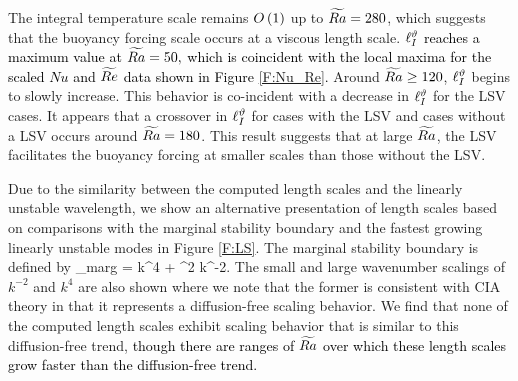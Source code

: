 The integral temperature scale remains $O\left ( 1 \right )$ up to $\widetilde{Ra} = 280$, which suggests that the buoyancy forcing scale occurs at a viscous length scale.
\textcolor{black}{$\ell_{I}^{\vartheta}$ reaches a maximum value at $\widetilde{Ra} = 50,$ which is coincident with the local maxima for the scaled $Nu$ and $\widetilde{Re}$ data shown in Figure \ref{F:Nu_Re}.}
Around $\widetilde{Ra} \geq 120$, $\ell_{I}^{\vartheta}$ begins to slowly increase. 
This behavior is co-incident with a decrease in $\ell_{I}^{\vartheta}$ for the LSV cases. 
It appears that a crossover in $\ell_{I}^{\vartheta}$ for cases with the LSV and cases without a LSV occurs around \textcolor{black}{$\widetilde{Ra} = 180$}. 
This result suggests that at large $\widetilde{Ra}$, the LSV facilitates the buoyancy forcing at smaller scales than those without the LSV. 









Due to the similarity between the computed length scales and the linearly unstable wavelength, we show an alternative presentation of length scales based on comparisons with the marginal stability boundary and the fastest growing linearly unstable modes in Figure \ref{F:LS}. The marginal stability boundary is defined by
\be
\Rat_{marg} = k^4 + \pi^2 k^{-2}. 
\ee
The small and large wavenumber scalings of $k^{-2}$ and $k^4$ are also shown where we note that the former  is consistent with CIA theory in that it represents a diffusion-free scaling behavior. We find that none of the computed length scales exhibit scaling behavior that is similar to this diffusion-free trend, \textcolor{black}{though there are ranges of $\widetilde{Ra}$ over which these length scales grow faster than the diffusion-free trend.}

